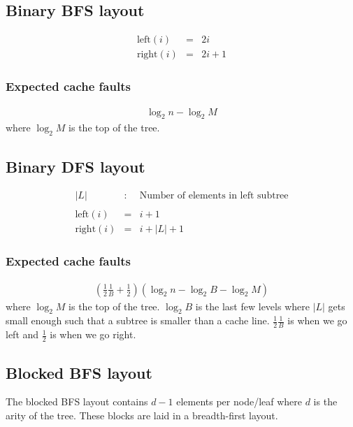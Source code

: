 \subsection{Binary BFS layout}

\begin{eqnarray*}
\mathrm{left}(i) & = & 2i \\
\mathrm{right}(i) & = & 2i + 1
\end{eqnarray*}

\subsubsection*{Expected cache faults}

\begin{eqnarray*}
\log_2 n - \log_2 M 
\end{eqnarray*}
where $\log_2 M$ is the top of the tree.

\subsection{Binary DFS layout}

\begin{eqnarray*}
|L| & : & \textrm{Number of elements in left subtree} \\
\\
\mathrm{left}(i) & = & i + 1 \\
\mathrm{right}(i) & = & i + |L| + 1
\end{eqnarray*}

\subsubsection*{Expected cache faults}


\begin{eqnarray*}
(\frac{1}{2}\frac{1}{B} + \frac{1}{2})(\log_2 n - \log_2 B - \log_2 M) 
\end{eqnarray*}
where $\log_2 M$ is the top of the tree. $\log_2 B$ is the last few levels where $|L|$ gets small enough such that a subtree is smaller than a cache line. $\frac{1}{2}\frac{1}{B}$ is when we go left and $\frac{1}{2}$ is when we go right.

\subsection{Blocked BFS layout}

The blocked BFS layout contains $d - 1$ elements per node/leaf where $d$ is the arity of the tree. These blocks are laid in a breadth-first layout.


